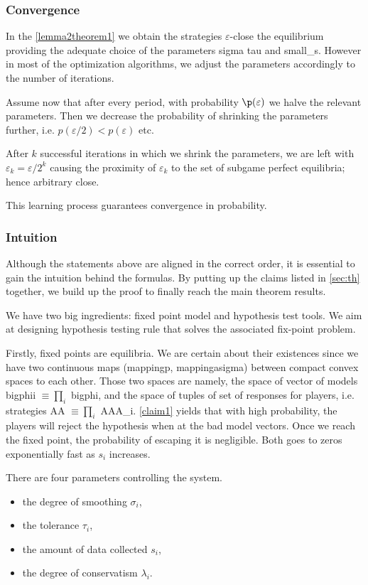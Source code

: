\documentclass[]{spie}  %
\begin{document}
\subsubsection{Convergence}
In the \autoref{lemma2theorem1} we obtain the strategies $\varepsilon$-close the equilibrium providing the adequate choice of the parameters \gls{sigma} \gls{tau} and \gls{small_s}. However in most of the optimization algorithms, we adjust the parameters accordingly to the number of iterations. %

Assume now that after every period, with probability $\p(\varepsilon)$ we halve the relevant parameters. Then we decrease the probability of shrinking the parameters further, i.e. $p(\varepsilon/2) < p(\varepsilon)$ etc.

After $k$ successful iterations in which we shrink the parameters, we are left with $\varepsilon_k = \varepsilon/2^k$ causing the proximity of $\varepsilon_k$ to the set of subgame perfect equilibria; hence arbitrary close. 

This learning process guarantees convergence in probability.


\subsubsection{Intuition}
Although the statements above are aligned in the correct order, it is essential to gain the intuition behind the formulas. By putting up the claims listed in \autoref{sec:th} together, we build up the proof to finally reach the main theorem results.

We have two big ingredients: fixed point model and hypothesis test tools. We aim at designing hypothesis testing rule that solves the associated fix-point problem.

Firstly, fixed points are equilibria. We are certain about their existences since we have two continuous maps (\gls{mappingp}, \gls{mappingasigma}) between compact convex spaces to each other. Those two spaces are namely, the space of vector of models \gls{bigphii} $ \equiv \prod_i$ \gls{bigphi}, and the space of tuples of set of responses for players, i.e. strategies \gls{AA} $\equiv \prod_i$ \gls{AAA_i}.
\autoref{claim1} yields that with high probability, the players will reject the hypothesis when at the bad model vectors. Once we reach the fixed point, the probability of escaping it is negligible. Both goes to zeros exponentially fast as $s_i$ increases.

There are four parameters controlling the system. 
\begin{itemize}
    \item the degree of smoothing $\sigma_i$,
    \item the tolerance $\tau_i$,
    \item the amount of data collected $s_i$,
    \item the degree of conservatism $\lambda_i$.
\end{itemize}
\end{document}
